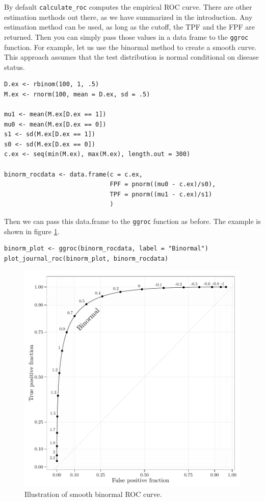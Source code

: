 \documentclass[article]{jss}
\begin{document}
By default \texttt{calculate\_roc} computes the empirical ROC curve.
There are other estimation methods out there, as we have summarized in
the introduction. Any estimation method can be used, as long as the
cutoff, the TPF and the FPF are returned. Then you can simply pass those
values in a data frame to the \texttt{ggroc} function. For example, let
us use the binormal method to create a smooth curve. This approach
assumes that the test distribution is normal conditional on disease
status.

\begin{verbatim}
D.ex <- rbinom(100, 1, .5)
M.ex <- rnorm(100, mean = D.ex, sd = .5)

mu1 <- mean(M.ex[D.ex == 1])
mu0 <- mean(M.ex[D.ex == 0])
s1 <- sd(M.ex[D.ex == 1])
s0 <- sd(M.ex[D.ex == 0])
c.ex <- seq(min(M.ex), max(M.ex), length.out = 300)

binorm_rocdata <- data.frame(c = c.ex, 
                             FPF = pnorm((mu0 - c.ex)/s0), 
                             TPF = pnorm((mu1 - c.ex)/s1)
                             )
\end{verbatim}

Then we can pass this data.frame to the \texttt{ggroc} function as
before. The example is shown in figure \ref{binorm}.

\begin{verbatim}
binorm_plot <- ggroc(binorm_rocdata, label = "Binormal")
plot_journal_roc(binorm_plot, binorm_rocdata)
\end{verbatim}

\begin{figure}[htbp]
\centering
\includegraphics{figure/binormal-1.pdf}
\caption{Illustration of smooth binormal ROC curve. \label{binorm}}
\end{figure}
\end{document}
